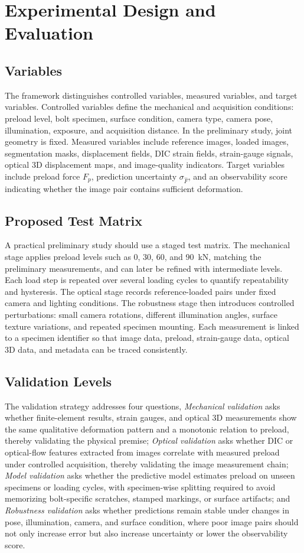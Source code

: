 \section{Experimental Design and Evaluation}
\subsection{Variables}
The framework distinguishes controlled variables, measured variables, and target variables. Controlled variables define the mechanical and acquisition conditions: preload level, bolt specimen, surface condition, camera type, camera pose, illumination, exposure, and acquisition distance. In the preliminary study, joint geometry is fixed. Measured variables include reference images, loaded images, segmentation masks, displacement fields, DIC strain fields, strain-gauge signals, optical 3D displacement maps, and image-quality indicators. Target variables include preload force $F_p$, prediction uncertainty $\sigma_{\hat{F}}$, and an observability score indicating whether the image pair contains sufficient deformation.

\subsection{Proposed Test Matrix}
A practical preliminary study should use a staged test matrix. The mechanical stage applies preload levels such as 0, 30, 60, and \SI{90}{\kilo\newton}, matching the preliminary measurements, and can later be refined with intermediate levels. Each load step is repeated over several loading cycles to quantify repeatability and hysteresis. The optical stage records reference-loaded pairs under fixed camera and lighting conditions. The robustness stage then introduces controlled perturbations: small camera rotations, different illumination angles, surface texture variations, and repeated specimen mounting. Each measurement is linked to a specimen identifier so that image data, preload, strain-gauge data, optical 3D data, and metadata can be traced consistently.

\subsection{Validation Levels}
The validation strategy addresses four questions, \textit{Mechanical validation} asks whether finite-element results, strain gauges, and optical 3D measurements show the same qualitative deformation pattern and a monotonic relation to preload, thereby validating the physical premise; \textit{Optical validation} asks whether DIC or optical-flow features extracted from images correlate with measured preload under controlled acquisition, thereby validating the image measurement chain; \textit{Model validation} asks whether the predictive model estimates preload on unseen specimens or loading cycles, with specimen-wise splitting required to avoid memorizing bolt-specific scratches, stamped markings, or surface artifacts; and \textit{Robustness validation} asks whether predictions remain stable under changes in pose, illumination, camera, and surface condition, where poor image pairs should not only increase error but also increase uncertainty or lower the observability score.


